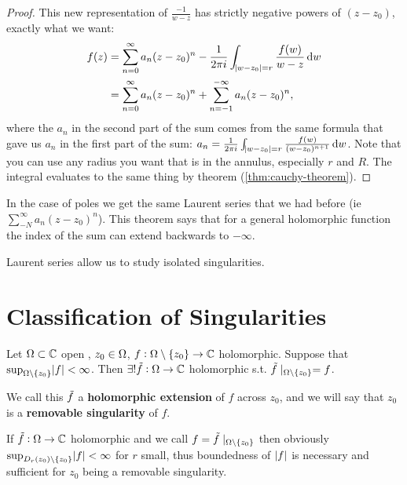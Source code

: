 \begin{proof}
This new representation of $\frac{-1}{w-z}$ has strictly negative powers of $(z-z_0)$, exactly what we want:
\begin{align*}
    f(z) &= \sum_{n=0}^\infty a_n (z-z_0)^n - \frac{1}{2 \pi i} \int_{\abs{w- z_0} = r} \frac{f(w)}{w-z} \dif w\\
    &= \sum_{n=0}^\infty a_n (z-z_0)^n + \sum_{n=-1}^{-\infty} a_n (z-z_0)^n,
\end{align*}
where the $a_n$ in the second part of the sum comes from the same formula that gave us $a_n$ in the first part of the sum: $a_n = \frac{1}{2 \pi i} \int_{\abs{w- z_0} = r} \frac{f(w)}{(w-z_0)^{n+1}} \dif w$. Note that you can use any radius you want that is in the annulus, especially $r$ and $R$. The integral evaluates to the same thing by theorem (\ref{thm:cauchy-theorem}).
\end{proof}


\begin{remark}
In the case of poles we get the same Laurent series that we had before (ie $\sum_{-N}^\infty a_n (z-z_0)^n$). This theorem says that for a general holomorphic function the index of the sum can extend backwards to $-\infty$.
\end{remark}


Laurent series allow us to study isolated singularities. 

\section{Classification of Singularities}
\begin{theorem}\label{thm:r-extension-thm}
Let $\Omega \subset \mathbb{C}$ open , $z_0\in \Omega$, $f: \Omega \setminus \{ z_0 \} \to \mathbb{C}$ holomorphic. Suppose that $\sup_{\Omega \setminus \{ z_0 \}}\abs{f} < \infty$. Then $\exists ! \Tilde{f}: \Omega \to \mathbb{C}$ holomorphic s.t. $\Tilde{f}\mid_{\Omega \setminus \{ z_0 \}} = f$.
\end{theorem}

\begin{definition}
We call this $\Tilde{f}$ a \textbf{holomorphic extension} of $f$ across $z_0$, and we will say that $z_0$ is a \textbf{removable singularity} of $f$.

\end{definition}



\begin{remark}
If $\Tilde{f}: \Omega \to \mathbb{C}$ holomorphic and we call $f=\Tilde{f}\mid_{\Omega \setminus \{ z_0 \}}$ then obviously $\sup_{D_r(z_0)\setminus \{z_0\} } \abs{f} < \infty$ for $r$ small, thus boundedness of $\, \abs{f}$ is necessary and sufficient for $z_0$ being a removable singularity.
\end{remark}

